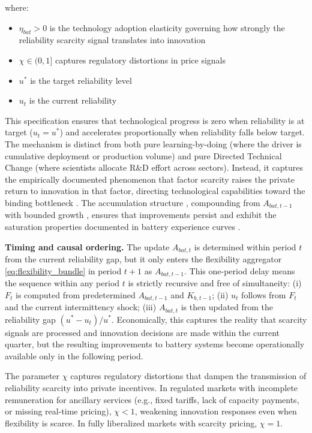 \documentclass[12pt, a4paper]{article}
\begin{document}
	where:
	\begin{itemize}
		\item $\eta_{bat} > 0$ is the technology adoption elasticity governing how strongly the reliability scarcity signal translates into innovation
		\item $\chi \in (0,1]$ captures regulatory distortions in price signals
		\item $u^*$ is the target reliability level
		\item $u_t$ is the current reliability
	\end{itemize}
	
	This specification ensures that technological progress is zero when reliability is at target ($u_t = u^*$) and accelerates proportionally when reliability falls below target. The mechanism is distinct from both pure learning-by-doing (where the driver is cumulative deployment or production volume) and pure Directed Technical Change (where scientists allocate R\&D effort across sectors). Instead, it captures the empirically documented phenomenon that factor scarcity raises the private return to innovation in that factor, directing technological capabilities toward the binding bottleneck \citep{popp2002, acemoglu2012environment, aghion2016, hassler2021}. The accumulation structure ,  compounding from $A_{bat,t-1}$ with bounded growth ,  ensures that improvements persist and exhibit the saturation properties documented in battery experience curves \citep{kittner2017, way2022}.
	
	\textbf{Timing and causal ordering.} The update $A_{bat,t}$ is determined within period $t$ from the current reliability gap, but it only enters the flexibility aggregator \eqref{eq:flexibility_bundle} in period $t+1$ as $A_{bat,t-1}$. This one-period delay means the sequence within any period $t$ is strictly recursive and free of simultaneity: (i) $F_t$ is computed from predetermined $A_{bat,t-1}$ and $K_{b,t-1}$; (ii) $u_t$ follows from $F_t$ and the current intermittency shock; (iii) $A_{bat,t}$ is then updated from the reliability gap $(u^* - u_t)/u^*$. Economically, this captures the reality that scarcity signals are processed and innovation decisions are made within the current quarter, but the resulting improvements to battery systems become operationally available only in the following period.
	
	The parameter $\chi$ captures regulatory distortions that dampen the transmission of reliability scarcity into private incentives. In regulated markets with incomplete remuneration for ancillary services (e.g., fixed tariffs, lack of capacity payments, or missing real-time pricing), $\chi < 1$, weakening innovation responses even when flexibility is scarce. In fully liberalized markets with scarcity pricing, $\chi = 1$.
	
\end{document}
